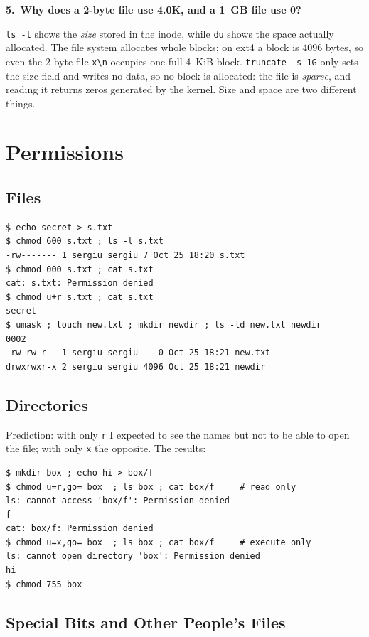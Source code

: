\documentclass[12pt,a4paper]{article}
\newcommand{\qa}[2]{%
  \par\needspace{5\baselineskip}\medskip
  \noindent\textbf{#1.~#2}\par\smallskip\noindent}
\begin{document}
\qa{5}{Why does a 2-byte file use 4.0K, and a 1~GB file use 0?}
\texttt{ls -l} shows the \textit{size} stored in the inode, while \texttt{du} shows the space actually allocated. The file system allocates whole blocks; on ext4 a block is 4096 bytes, so even the 2-byte file \texttt{x\textbackslash n} occupies one full 4~KiB block. \texttt{truncate -s 1G} only sets the size field and writes no data, so no block is allocated: the file is \textit{sparse}, and reading it returns zeros generated by the kernel. Size and space are two different things.

\newpage
\section{Permissions}

\subsection{Files}

\begin{lstlisting}[style=terminal,caption={Permission bits on a regular file and the umask}]
$ echo secret > s.txt
$ chmod 600 s.txt ; ls -l s.txt
-rw------- 1 sergiu sergiu 7 Oct 25 18:20 s.txt
$ chmod 000 s.txt ; cat s.txt
cat: s.txt: Permission denied
$ chmod u+r s.txt ; cat s.txt
secret
$ umask ; touch new.txt ; mkdir newdir ; ls -ld new.txt newdir
0002
-rw-rw-r-- 1 sergiu sergiu    0 Oct 25 18:21 new.txt
drwxrwxr-x 2 sergiu sergiu 4096 Oct 25 18:21 newdir
\end{lstlisting}

\subsection{Directories}

Prediction: with only \texttt{r} I expected to see the names but not to be able to open the file; with only \texttt{x} the opposite. The results:

\begin{lstlisting}[style=terminal,caption={The box experiment}]
$ mkdir box ; echo hi > box/f
$ chmod u=r,go= box  ; ls box ; cat box/f     # read only
ls: cannot access 'box/f': Permission denied
f
cat: box/f: Permission denied
$ chmod u=x,go= box  ; ls box ; cat box/f     # execute only
ls: cannot open directory 'box': Permission denied
hi
$ chmod 755 box
\end{lstlisting}

\subsection{Special Bits and Other People's Files}
\end{document}
